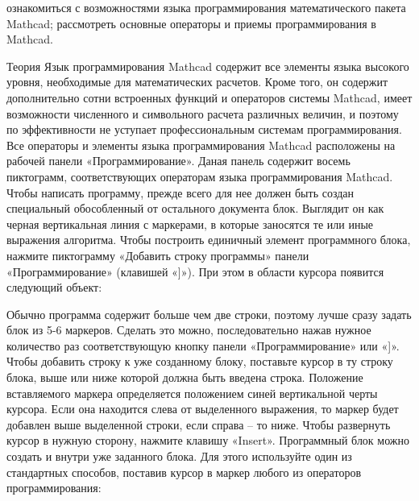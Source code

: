 
\goal ознакомиться с возможностями языка программирования математического пакета Mathcad; рассмотреть основные операторы и приемы программирования в Mathcad.

Теория
Язык программирования Mathcad содержит все элементы языка высокого уровня, необходимые для математических расчетов. Кроме того, он содержит дополнительно сотни встроенных функций и операторов системы Mathcad, имеет возможности численного и символьного расчета различных величин, и поэтому по эффективности не уступает профессиональным системам программирования.
Все операторы и элементы языка программирования Mathcad расположены на рабочей панели «Программирование». Даная панель содержит восемь пиктограмм, соответствующих операторам языка программирования Mathcad. 
Чтобы написать программу, прежде всего для нее должен быть создан специальный обособленный от остального документа блок. Выглядит он как черная вертикальная линия с маркерами, в которые заносятся те или иные выражения алгоритма. Чтобы построить единичный элемент программного блока, нажмите пиктограмму «Добавить строку программы» панели «Программирование» (клавишей «]»). При этом в области курсора появится следующий объект:

Обычно программа содержит больше чем две строки, поэтому лучше сразу задать блок из 5-6 маркеров. Сделать это можно, последовательно нажав нужное количество раз соответствующую кнопку панели «Программирование» или «]». 
Чтобы добавить строку к уже созданному блоку, поставьте курсор в ту строку блока, выше или ниже которой должна быть введена строка. Положение вставляемого маркера определяется положением синей вертикальной черты курсора. Если она находится слева от выделенного выражения, то маркер будет добавлен выше выделенной строки, если справа – то ниже. Чтобы развернуть курсор в нужную сторону, нажмите клавишу «Insert».
Программный блок можно создать и внутри уже заданного блока. Для этого используйте один из стандартных способов, поставив курсор в маркер любого из операторов программирования:

